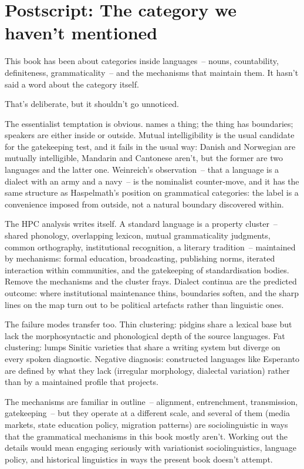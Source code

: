 \chapter*{Postscript: The category we haven't mentioned}

\noindent This book has been about categories inside languages~-- nouns, countability, definiteness, grammaticality~-- and the mechanisms that maintain them. It hasn't said a word about the category  itself.

That's deliberate, but it shouldn't go unnoticed.

The essentialist temptation is obvious.  names a thing; the thing has boundaries; speakers are either inside or outside. Mutual intelligibility is the usual candidate for the gatekeeping test, and it fails in the usual way: Danish and Norwegian are mutually intelligible, Mandarin and Cantonese aren't, but the former are two languages and the latter one. Weinreich's observation~-- that a language is a dialect with an army and a navy~-- is the nominalist counter-move, and it has the same structure as Haspelmath's position on grammatical categories: the label is a convenience imposed from outside, not a natural boundary discovered within.

The HPC analysis writes itself. A standard language is a property cluster~-- shared phonology, overlapping lexicon, mutual grammaticality judgments, common orthography, institutional recognition, a literary tradition~-- maintained by mechanisms: formal education, broadcasting, publishing norms, iterated interaction within communities, and the gatekeeping of standardisation bodies. Remove the mechanisms and the cluster frays. Dialect continua are the predicted outcome: where institutional maintenance thins, boundaries soften, and the sharp lines on the map turn out to be political artefacts rather than linguistic ones.

The failure modes transfer too. Thin clustering: pidgins share a lexical base but lack the morphosyntactic and phonological depth of the source languages. Fat clustering:  lumps Sinitic varieties that share a writing system but diverge on every spoken diagnostic. Negative diagnosis: constructed languages like Esperanto are defined by what they lack (irregular morphology, dialectal variation) rather than by a maintained profile that projects.

The mechanisms are familiar in outline~-- alignment, entrenchment, transmission, gatekeeping~-- but they operate at a different scale, and several of them (media markets, state education policy, migration patterns) are sociolinguistic in ways that the grammatical mechanisms in this book mostly aren't. Working out the details would mean engaging seriously with variationist sociolinguistics, language policy, and historical linguistics in ways the present book doesn't attempt.

